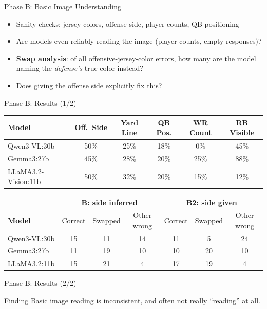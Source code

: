 \documentclass[9pt,aspectratio=169]{beamer}
\begin{document}
\begin{frame}{Phase B: Basic Image Understanding}
  \begin{itemize}
    \item Sanity checks: jersey colors, offense side, player counts, QB positioning
    \item Are models even reliably reading the image (player counts, empty responses)?
    \item \textbf{Swap analysis}: of all offensive-jersey-color errors, how many are the model naming the \emph{defense's} true color instead?
    \item Does giving the offense side explicitly fix this?
  \end{itemize}
\end{frame}

\begin{frame}{Phase B: Results (1/2)}
  \centering
  \tiny
  \renewcommand{\arraystretch}{1.15}
  \begin{tabular}{lccccc}
    \toprule
    \textbf{Model} & \textbf{Off.\ Side} & \textbf{Yard Line} & \textbf{QB Pos.} & \textbf{WR Count} & \textbf{RB Visible} \\
    \midrule
    Qwen3-VL:30b        & 50\% & 25\% & 18\% &  0\% & 45\% \\
    Gemma3:27b          & 45\% & 28\% & 20\% & 25\% & 88\% \\
    LLaMA3.2-Vision:11b & 50\% & 32\% & 20\% & 15\% & 12\% \\
    \bottomrule
  \end{tabular}

  \vspace{6pt}
  \begin{tabular}{lccc|ccc}
    \toprule
     & \multicolumn{3}{c|}{\textbf{B: side inferred}} & \multicolumn{3}{c}{\textbf{B2: side given}} \\
    \textbf{Model} & Correct & Swapped & Other wrong & Correct & Swapped & Other wrong \\
    \midrule
    Qwen3-VL:30b   & 15 & 11 & 14 & 11 &  5 & 24 \\
    Gemma3:27b     & 11 & 19 & 10 & 10 & 20 & 10 \\
    LLaMA3.2:11b   & 15 & 21 &  4 & 17 & 19 &  4 \\
    \bottomrule
  \end{tabular}
\end{frame}

\begin{frame}{Phase B: Results (2/2)}
  \begin{alertblock}{Finding}
    Basic image reading is inconsistent, and often not really ``reading'' at all.
  \end{alertblock}
\end{frame}
\end{document}

